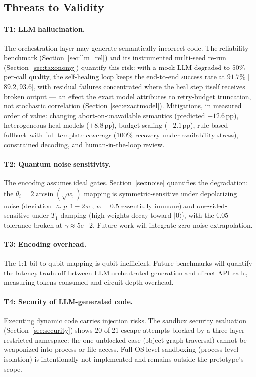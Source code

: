 ﻿\documentclass[12pt,a4paper]{article}
\begin{document}
\subsection{Threats to Validity}\label{sec:threats}

\paragraph{T1: LLM hallucination.} The orchestration layer may generate semantically incorrect code. The reliability benchmark (Section~\ref{sec:llm_rel}) and its instrumented multi-seed re-run (Section~\ref{sec:taxonomy}) quantify this risk: with a mock LLM degraded to 50\% per-call quality, the self-healing loop keeps the end-to-end success rate at $91.7\%$ [$89.2, 93.6$], with residual failures concentrated where the heal step itself receives broken output --- an effect the exact model attributes to retry-budget truncation, not stochastic correlation (Section~\ref{sec:exactmodel}). Mitigations, in measured order of value: changing abort-on-unavailable semantics (predicted $+12.6$\,pp), heterogeneous heal models ($+8.8$\,pp), budget scaling ($+2.1$\,pp), rule-based fallback with full template coverage ($100\%$ recovery under availability stress), constrained decoding, and human-in-the-loop review.

\paragraph{T2: Quantum noise sensitivity.} The encoding assumes ideal gates. Section~\ref{sec:noise} quantifies the degradation: the $\theta_i = 2\arcsin(\sqrt{w_i})$ mapping is symmetric-sensitive under depolarizing noise (deviation $\approx p\,|1-2w|$; $w=0.5$ essentially immune) and one-sided-sensitive under $T_1$ damping (high weights decay toward $|0\rangle$), with the $0.05$ tolerance broken at $\gamma \approx 5\mathrm{e}{-2}$. Future work will integrate zero-noise extrapolation.

\paragraph{T3: Encoding overhead.} The 1:1 bit-to-qubit mapping is qubit-inefficient. Future benchmarks will quantify the latency trade-off between LLM-orchestrated generation and direct API calls, measuring tokens consumed and circuit depth overhead.

\paragraph{T4: Security of LLM-generated code.} Executing dynamic code carries injection risks. The sandbox security evaluation (Section~\ref{sec:security}) shows 20 of 21 escape attempts blocked by a three-layer restricted namespace; the one unblocked case (object-graph traversal) cannot be weaponized into process or file access. Full OS-level sandboxing (process-level isolation) is intentionally not implemented and remains outside the prototype's scope.
\end{document}
